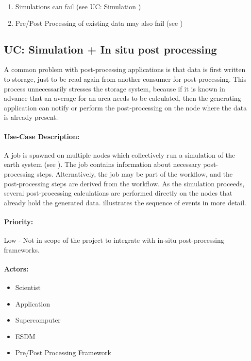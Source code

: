 \begin{enumerate}
	\item Simulations can fail (see UC: Simulation )
	\item Pre/Post Processing of existing data may also fail (see )
\end{enumerate}


\subsection{UC: Simulation + In situ post processing}
\label{uc: simulation + in-situ + post processing}

A common problem with post-processing applications is that data is first written to storage, just to be read again from another consumer for post-processing.
This process unnecessarily stresses the storage system, because if it is known in advance that an average for an area needs to be calculated, then the generating application can notify or perform the post-processing on the node where the data is already present.


\paragraph{Use-Case Description:}
A job is spawned on multiple nodes which collectively run a simulation of the earth system (see ).
The job contains information about necessary post-processing steps.
Alternatively, the job may be part of the workflow, and the post-processing steps are derived from the workflow.
As the simulation proceeds, several post-processing calculations are performed directly on the nodes that already hold the generated data.
 illustrates the sequence of events in more detail.

\paragraph{Priority:} Low - Not in scope of the project to integrate with in-situ post-processing frameworks.


\paragraph{Actors:}
\begin{itemize}
	\item Scientist
	\item Application
	\item Supercomputer
	\item ESDM
	\item Pre/Post Processing Framework
\end{itemize}


